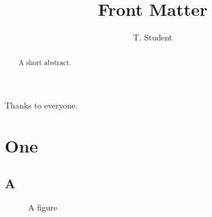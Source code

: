 \documentclass[phd,@OPTIONS@,12pt,a4paper]{bangorthesis}
\title{Front Matter}
\author{T. Student}
\begin{document}
\maketitle
\begin{acknowledgements}
  Thanks to everyone.
\end{acknowledgements}
\begin{abstract}
  A short abstract.
\end{abstract}
\tables
\printabbrevs
\chapter{One}
\section{A}
\begin{figure}[h]\caption{A figure}\end{figure}
\begin{table}[h]\caption{A table}\end{table}
\end{document}
